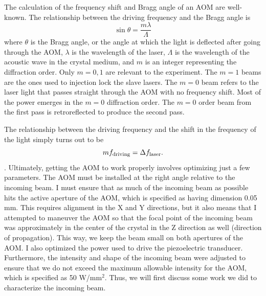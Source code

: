 The calculation of the frequency shift and Bragg angle of an AOM are well-known. The relationship between the driving frequency and the Bragg angle is 
\begin{equation}
\sin{\theta}=\frac{m \lambda}{\Lambda}
\end{equation}
where $\theta$ is the Bragg angle, or the angle at which the light is deflected after going through the AOM, $\lambda$ is the wavelength of the laser, $\Lambda$ is the wavelength of the acoustic wave in the crystal medium, and $m$ is an integer representing the diffraction order. Only $m=0,1$ are relevant to the experiment. The $m=1$ beams are the ones used to injection lock the slave lasers. The $m=0$ beam refers to the laser light that passes straight through the AOM with no frequency shift. Most of the power emerges in the $m=0$ diffraction order. The $m=0$ order beam from the first pass is retroreflected to produce the second pass.

The relationship between the driving frequency and the shift in the frequency of the light simply turns out to be 
\begin{equation}
    mf_{\textnormal{driving}}=\Delta f_{\textnormal{laser}}.
\end{equation}.
Ultimately, getting the AOM to work properly involves optimizing just a few parameters. The AOM must be installed at the right angle relative to the incoming beam. I must ensure that as much of the incoming beam as possible hits the active aperture of the AOM, which is specified as having dimension 0.05 mm. This requires alignment in the X and Y directions, but it also means that I attempted to maneuver the AOM so that the focal point of the incoming beam was approximately in the center of the crystal in the Z direction as well (direction of propagation). This way, we keep the beam small on both apertures of the AOM. I also optimized the power used to drive the piezoelectric transducer. Furthermore, the intensity and shape of the incoming beam were adjusted to ensure that we do not exceed the maximum allowable intensity for the AOM, which is specified as 50 W/mm$^2$.
Thus, we will first discuss some work we did to characterize the incoming beam.


